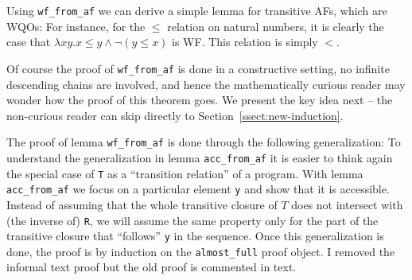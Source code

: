 \documentclass{llncs}
\newcommand{\dv}[1]{{\color{red}{\bf DV:} #1}}
\begin{document}
Using \lstinline|wf_from_af| we can derive a simple lemma for transitive AFs, which
are WQOs: 
For instance, for the $\leq$ relation on natural numbers, it is clearly the case 
that $\lambda x y. x \leq y \land \lnot(y \leq x)$ is WF. This relation is simply $<$.

Of course the proof of \lstinline|wf_from_af| is done in a constructive setting, no infinite 
descending chains are involved, and hence the mathematically curious reader may wonder how 
the proof of this theorem goes. We present the key idea next -- the non-curious reader can 
skip directly to Section~\ref{ssect:new-induction}.

The proof of lemma \lstinline|wf_from_af| is done through the following generalization:
To understand the generalization in lemma \lstinline|acc_from_af| it is easier to think again the 
special case of \lstinline|T| as a ``transition relation'' of a program. With lemma \lstinline|acc_from_af| 
we focus on a particular element \lstinline|y| and show that it is accessible. Instead of assuming that
the whole transitive closure of $T$ does not intersect with (the inverse of) \lstinline|R|, we will assume 
the same property only for the part of the transitive closure that ``follows'' \lstinline|y| in the sequence. 
Once this generalization is done, the proof is by induction on the \lstinline|almost_full| proof object.
\dv{I removed the informal text proof but the old proof is commented in text.}
\end{document}
